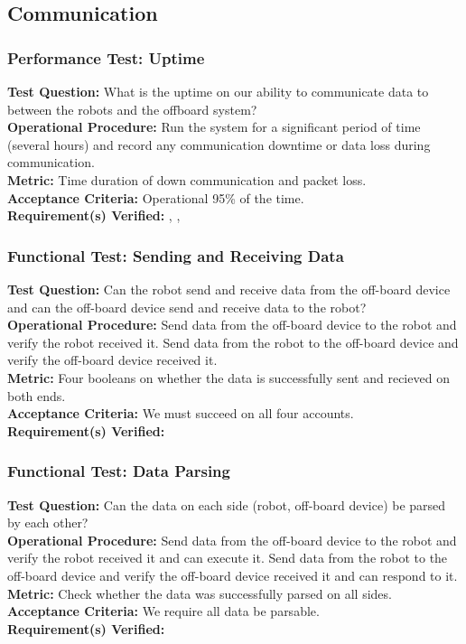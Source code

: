 
\subsection{Communication}
\label{sec:verification_comm}


\subsubsection{Performance Test: Uptime}
\label{test:comm_pt_reliability}
\textbf{Test Question:} What is the uptime on our ability to communicate data to between the robots and the offboard system?  \\
\textbf{Operational Procedure:} Run the system for a significant period of time (several hours) and record any communication downtime or data loss during communication. \\
\textbf{Metric:} Time duration of down communication and packet loss. \\
\textbf{Acceptance Criteria:} Operational 95\% of the time.\\
\textbf{Requirement(s) Verified:} , , 

\subsubsection{Functional Test: Sending and Receiving Data}
\label{test:comm_ft_send}
\textbf{Test Question:} Can the robot send and receive data from the off-board device and can the off-board device send and receive data to the robot?\\
\textbf{Operational Procedure:} Send data from the off-board device to the robot and verify the robot received it. Send data from the robot to the off-board device and verify the off-board device received it. \\
\textbf{Metric:} Four booleans on whether the data is successfully sent and recieved on both ends. \\
\textbf{Acceptance Criteria:} We must succeed on all four accounts. \\
\textbf{Requirement(s) Verified:} 

\subsubsection{Functional Test: Data Parsing}
\label{test:comm_ft_parse}
\textbf{Test Question:}  Can the data on each side (robot, off-board device) be parsed by each other? \\
\textbf{Operational Procedure:} Send data from the off-board device to the robot and verify the robot received it and can execute it. Send data from the robot to the off-board device and verify the off-board device received it and can respond to it. \\
\textbf{Metric:} Check whether the data was successfully parsed on all sides. \\
\textbf{Acceptance Criteria:} We require all data be parsable. \\
\textbf{Requirement(s) Verified:} 


